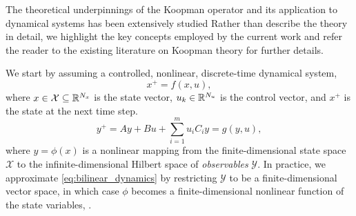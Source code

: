 \documentclass[../root.tex]{subfiles}
\begin{document}
The theoretical underpinnings of the Koopman operator and its application to
dynamical systems has been extensively studied 
\cite{fasel_SINDy_2021,proctor_Generalizing_2018,bruder_Advantages_2021,williams_Data_2015,surana_Koopman_2016}
Rather than describe the theory in detail, we highlight the key concepts
employed by the current work and refer the reader to the existing literature on
Koopman theory for further details.

We start by assuming a controlled, nonlinear, discrete-time dynamical system,
\begin{equation} \label{eq:discrete_dynamics} 
  x^+ = f(x, u), 
\end{equation} 
where $x \in \mathcal{X} \subseteq \mathbb{R}^{N_x}$ is the state vector, $u_k \in
\mathbb{R}^{N_u}$ is the control vector, and $x^+$ is the state at the next time step.
\begin{equation} \label{eq:bilinear_dynamics}
  y^+ = A y + B u + \sum_{i=1}^m u_i C_i y = g(y,u) ,
\end{equation}
where $y = \phi(x)$ is a nonlinear mapping from the finite-dimensional state
space $\mathcal{X}$ to the infinite-dimensional Hilbert space of
\textit{observables} $\mathcal{Y}$.  In practice, we approximate
\eqref{eq:bilinear_dynamics} by restricting $\mathcal{Y}$ to be a
finite-dimensional vector space, in which case $\phi$ becomes a
finite-dimensional nonlinear function of the state variables, .
\end{document}
